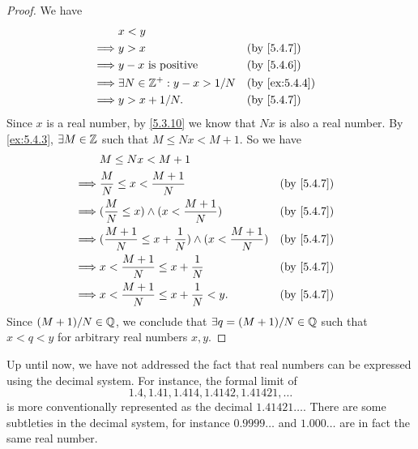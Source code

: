 \begin{proof}
  We have
  \begin{align*}
             & x < y                                                 \\
    \implies & y > x                              &  & \by{5.4.7}    \\
    \implies & y - x \text{ is positive}          &  & \by{5.4.6}    \\
    \implies & \exists N \in \Z^+ : y - x > 1 / N &  & \by{ex:5.4.4} \\
    \implies & y > x + 1 / N.                     &  & \by{5.4.7}    \\
  \end{align*}
  Since \(x\) is a real number, by \cref{5.3.10} we know that \(Nx\) is also a real number.
  By \cref{ex:5.4.3}, \(\exists M \in \mathbb{Z}\) such that \(M \leq Nx < M + 1\).
  So we have
  \begin{align*}
             & M \leq Nx < M + 1                                                                     \\
    \implies & \dfrac{M}{N} \leq x < \dfrac{M + 1}{N}                                &  & \by{5.4.7} \\
    \implies & (\dfrac{M}{N} \leq x) \land (x < \dfrac{M + 1}{N})                    &  & \by{5.4.7} \\
    \implies & (\dfrac{M + 1}{N} \leq x + \dfrac{1}{N}) \land (x < \dfrac{M + 1}{N}) &  & \by{5.4.7} \\
    \implies & x < \dfrac{M + 1}{N} \leq x + \dfrac{1}{N}                            &  & \by{5.4.7} \\
    \implies & x < \dfrac{M + 1}{N} \leq x + \dfrac{1}{N} < y.                       &  & \by{5.4.7}
  \end{align*}
  Since \((M + 1) / N \in \mathbb{Q}\), we conclude that \(\exists q = (M + 1) / N \in \mathbb{Q}\) such that \(x < q < y\) for arbitrary real numbers \(x, y\).
\end{proof}

\begin{rmk}\label{5.4.15}
  Up until now, we have not addressed the fact that real numbers can be expressed using the decimal system.
  For instance, the formal limit of
  \[
    1.4, 1.41, 1.414, 1.4142, 1.41421, \dots
  \]
  is more conventionally represented as the decimal \(1.41421\dots\).
  There are some subtleties in the decimal system, for instance \(0.9999\dots\) and \(1.000\dots\) are in fact the same real number.
\end{rmk}

